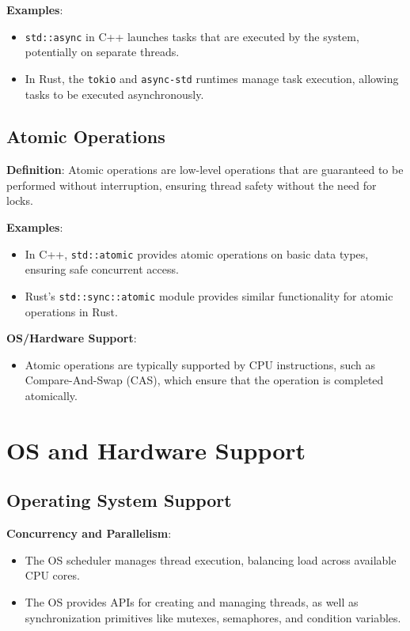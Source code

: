 \documentclass{article}
\begin{document}
\textbf{Examples}:
\begin{itemize}
    \item \texttt{std::async} in C++ launches tasks that are executed by the system, potentially on separate threads.
    \item In Rust, the \texttt{tokio} and \texttt{async-std} runtimes manage task execution, allowing tasks to be executed asynchronously.
\end{itemize}

\subsection*{Atomic Operations}
\textbf{Definition}: Atomic operations are low-level operations that are guaranteed to be performed without interruption, ensuring thread safety without the need for locks.

\textbf{Examples}:
\begin{itemize}
    \item In C++, \texttt{std::atomic} provides atomic operations on basic data types, ensuring safe concurrent access.
    \item Rust's \texttt{std::sync::atomic} module provides similar functionality for atomic operations in Rust.
\end{itemize}

\textbf{OS/Hardware Support}:
\begin{itemize}
    \item Atomic operations are typically supported by CPU instructions, such as Compare-And-Swap (CAS), which ensure that the operation is completed atomically.
\end{itemize}

\section*{OS and Hardware Support}

\subsection*{Operating System Support}
\textbf{Concurrency and Parallelism}:
\begin{itemize}
    \item The OS scheduler manages thread execution, balancing load across available CPU cores.
    \item The OS provides APIs for creating and managing threads, as well as synchronization primitives like mutexes, semaphores, and condition variables.
\end{itemize}
\end{document}
